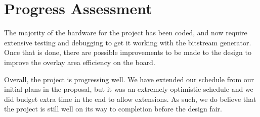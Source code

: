 \documentclass[12pt,letterpaper]{article}
\begin{document}
\section{Progress Assessment}

The majority of the hardware for the project has been coded, and now require extensive testing and debugging to get it working with the bitstream generator.
Once that is done, there are possible improvements to be made to the design to improve the overlay area efficiency on the board.

Overall, the project is progressing well. We have extended our schedule from our initial plans in the proposal, but it was an extremely optimistic schedule and we did budget extra time in the end to allow extensions. As such, we do believe that the project is still well on its way to completion before the design fair.
\end{document}
